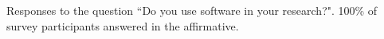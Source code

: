 \label{fig:doyouse}

Responses to the question ``Do you use software in your research?". 100\% of survey participants answered in the affirmative. 
  
  
